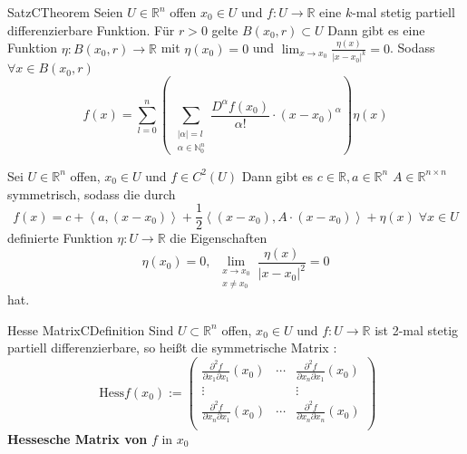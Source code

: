 %
%
%
%
\begin{ibox}[41]{Satz}{CTheorem}
    Seien $ U \in \mathbb{R}^n  $ offen $ x_0 \in U $ und $ f: U \to \mathbb{R}  $ eine $ k $-mal stetig partiell differenzierbare 
	Funktion. Für $ r>0 $ gelte $ B(x_0,r) \subset U$  Dann gibt es eine Funktion $ \eta : B \left( x_0, r \right) \to \mathbb{R}  $ 
	mit $ \eta \left(x_0\right)  = 0 $ und $ \lim_{ x \to x_0} \frac{\eta \left(x\right) }{|x-x_0|^{k}}  = 0 $. Sodass $ \forall  x \in 
	B \left( x_0, r \right) $ 
	$$ f(x) = \sum_{l=0}^{n} \left(\, \sum_{\substack{ |\alpha| = l \\ \alpha \in \mathbb{N}_{0}^{n} }} \frac{D^{\alpha }f
	\left(x_0\right) }{\alpha !} \cdot \left( x - x_0 \right) ^{\alpha }  \right) \eta \left(x\right)   $$
\end{ibox}
Sei $ U \in \mathbb{R}^n  $ offen, $ x_0 \in U $ und $ f \in  C^{2} \left(U\right)  $ Dann gibt es $ c \in \mathbb{R} , a \in \mathbb{R}^n $
$ A \in \mathbb{R}^{n \times n}  $ symmetrisch, sodass die durch 
$$ f \left(x\right)  = c + \left< a, \left( x - x_0 \right)  \right> + \frac{1}{2} \left<(x-x_0), A \cdot (x-x_0) \right> + 
\eta \left(x\right) \; \forall x \in U	$$ 
definierte Funktion $ \eta : U \to \mathbb{R}  $ die Eigenschaften 
$$ \eta \left(x_0\right)  = 0 , \; \lim_{ \substack{ x \to x_0 \\x \neq x_0 } } \frac{\eta \left(x\right) }{ |x - x_0|^{2}} = 0  $$
hat.
\begin{ibox}[]{Hesse Matrix}{CDefinition}
    Sind $ U \subset \mathbb{R}^n  $ offen, $ x_0 \in U $ und $ f: U \to \mathbb{R}  $ ist 2-mal stetig partiell differenzierbare, so
	heißt die symmetrische Matrix : 
	$$ \text{ Hess}f \left(x_0\right) := \begin{pmatrix}
		\frac{\partial ^{2} f}{\partial x_1 \partial x_1} \left(x_0\right) & \cdots    
	 	&\frac{\partial ^{2} f}{\partial x_n \partial x_1} \left(x_0\right) \\
		\vdots & & \vdots \\
		\frac{\partial ^{2} f}{\partial x_n \partial x_1} \left(x_0\right) & \cdots    
	 	&\frac{\partial ^{2} f}{\partial x_n \partial x_n} \left(x_0\right) \\
	\end{pmatrix}
	  $$
\textbf{Hessesche Matrix von} $ f \text{ in } x_0 $ 	
\end{ibox}
